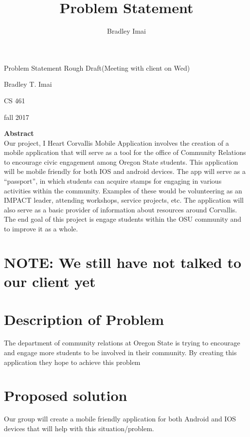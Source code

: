 \documentclass[letterpaper, 10pt, titlepage, fleqn, onecolumn]{article}
\title{Problem Statement}
\author{Bradley Imai\name}
\def\name{Bradley T. Imai}
\begin{document}
\begin{titlepage}
	\centering
    \vspace*{2.5in}
    {\LARGE Problem Statement Rough Draft(Meeting with client on Wed) \par}
    \vspace{0.1in}
    {\Large \name \par}
    {\large CS 461 \par}
    {\large fall 2017 \par}
    \textbf{Abstract}\\

        \vspace{0.5cm}
		Our project, I Heart Corvallis Mobile Application involves the creation of a mobile application that will serve as a tool for the office of Community Relations to encourage civic engagement among Oregon State students.  This application will be mobile friendly for both IOS and android devices. The app will serve as a “passport”, in which students can acquire stamps for engaging in various activities within the community. Examples of these would be volunteering as an IMPACT leader, attending workshops, service projects, etc. The application will also serve as a basic provider of information about resources around Corvallis. The end goal of this project is engage students within the OSU community and to improve it as a whole.   
        

    \vfill
\end{titlepage}

\newpage
\tableofcontents
\newpage

\section{NOTE: We still have not talked to our client yet}


\section{Description of Problem}
	The department of community relations at Oregon State is trying to encourage and engage more students to be involved in their community. By creating this application they hope to achieve this problem  
    
\section{Proposed solution}
Our group will create a mobile friendly application for both Android and IOS devices that will help with this situation/problem. 
\end{document}
